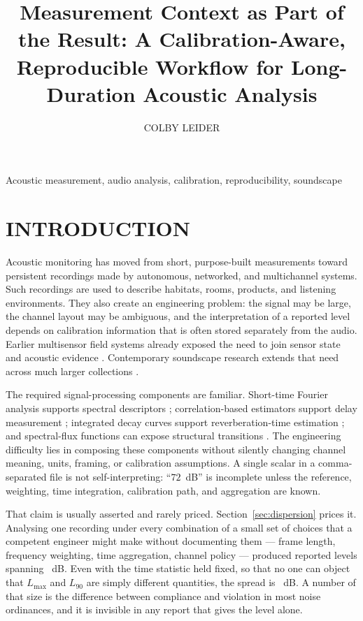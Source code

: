 \documentclass[final]{jaes}
\title{Measurement Context as Part of the Result: A Calibration-Aware, Reproducible Workflow for Long-Duration Acoustic Analysis}
\author{COLBY LEIDER}
\affil{ecoSignalLab Project, United States}
\begin{document}
\maketitle

\begin{keywords}
Acoustic measurement, audio analysis, calibration, reproducibility, soundscape
\end{keywords}

\section{INTRODUCTION}

Acoustic monitoring has moved from short, purpose-built measurements toward persistent recordings made by autonomous, networked, and multichannel systems. Such recordings are used to describe habitats, rooms, products, and listening environments. They also create an engineering problem: the signal may be large, the channel layout may be ambiguous, and the interpretation of a reported level depends on calibration information that is often stored separately from the audio. Earlier multisensor field systems already exposed the need to join sensor state and acoustic evidence \cite{leider2010}. Contemporary soundscape research extends that need across much larger collections \cite{krause2008,pijanowski2011,merchant2015}.

The required signal-processing components are familiar. Short-time Fourier analysis supports spectral descriptors \cite{allen1977}; correlation-based estimators support delay measurement \cite{knapp1976,carter1987}; integrated decay curves support reverberation-time estimation \cite{schroeder1965}; and spectral-flux functions can expose structural transitions \cite{dixon2006,bello2005}. The engineering difficulty lies in composing these components without silently changing channel meaning, units, framing, or calibration assumptions. A single scalar in a comma-separated file is not self-interpreting: ``$72$~dB'' is incomplete unless the reference, weighting, time integration, calibration path, and aggregation are known.

That claim is usually asserted and rarely priced. Section~\ref{sec:dispersion} prices it. Analysing one recording under every combination of a small set of choices that a competent engineer might make without documenting them --- frame length, frequency weighting, time aggregation, channel policy --- produced reported levels spanning \dispRange~dB. Even with the time statistic held fixed, so that no one can object that $L_{\mathrm{max}}$ and $L_{90}$ are simply different quantities, the spread is \dispConservativeRange~dB. A number of that size is the difference between compliance and violation in most noise ordinances, and it is invisible in any report that gives the level alone.
\end{document}
